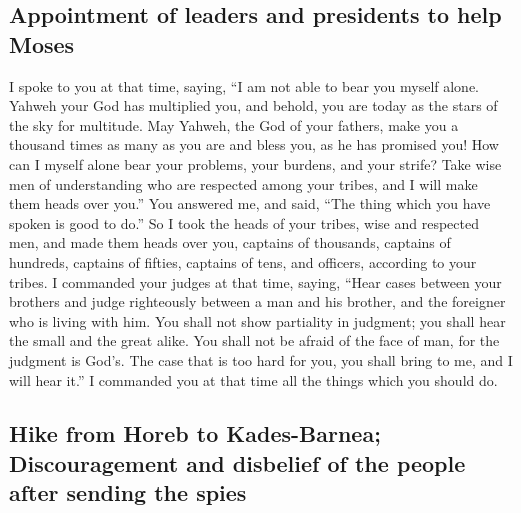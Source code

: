 \hypertarget{appointment-of-leaders-and-presidents-to-help-moses}{%
\subsection{Appointment of leaders and presidents to help
Moses}\label{appointment-of-leaders-and-presidents-to-help-moses}}

 I spoke to you at that time, saying, ``I am not able to
bear you myself alone.  Yahweh your God has multiplied
you, and behold, you are today as the stars of the sky for multitude.
 May Yahweh, the God of your fathers, make you a thousand
times as many as you are and bless you, as he has promised you!
 How can I myself alone bear your problems, your burdens,
and your strife?  Take wise men of understanding who are
respected among your tribes, and I will make them heads over you.''
 You answered me, and said, ``The thing which you have
spoken is good to do.''  So I took the heads of your
tribes, wise and respected men, and made them heads over you, captains
of thousands, captains of hundreds, captains of fifties, captains of
tens, and officers, according to your tribes.  I
commanded your judges at that time, saying, ``Hear cases between your
brothers and judge righteously between a man and his brother, and the
foreigner who is living with him.  You shall not show
partiality in judgment; you shall hear the small and the great alike.
You shall not be afraid of the face of man, for the judgment is God's.
The case that is too hard for you, you shall bring to me, and I will
hear it.''  I commanded you at that time all the things
which you should do.

\hypertarget{hike-from-horeb-to-kades-barnea-discouragement-and-disbelief-of-the-people-after-sending-the-spies}{%
\subsection{Hike from Horeb to Kades-Barnea; Discouragement and
disbelief of the people after sending the
spies}\label{hike-from-horeb-to-kades-barnea-discouragement-and-disbelief-of-the-people-after-sending-the-spies}}

